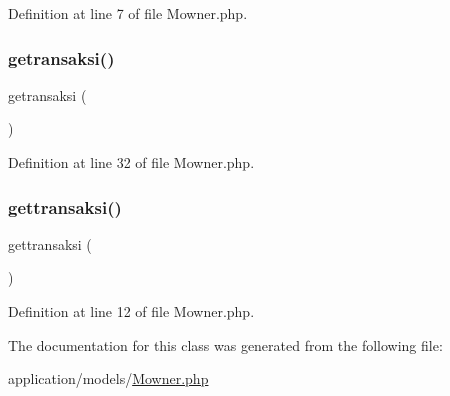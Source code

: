 Definition at line 7 of file Mowner.\+php.

\mbox{\label{class_mowner_a3319423f546cd9da9d35934bc832f5d5}} 
\subsubsection{\texorpdfstring{getransaksi()}{getransaksi()}}
{\footnotesize\ttfamily getransaksi (\begin{DoxyParamCaption}{ }\end{DoxyParamCaption})}



Definition at line 32 of file Mowner.\+php.

\mbox{\label{class_mowner_ab958d1edbfec72a356320e4cdc1f03ee}} 
\subsubsection{\texorpdfstring{gettransaksi()}{gettransaksi()}}
{\footnotesize\ttfamily gettransaksi (\begin{DoxyParamCaption}{ }\end{DoxyParamCaption})}



Definition at line 12 of file Mowner.\+php.



The documentation for this class was generated from the following file\+:\begin{DoxyCompactItemize}
\item 
application/models/\mbox{\hyperlink{_mowner_8php}{Mowner.\+php}}\end{DoxyCompactItemize}
